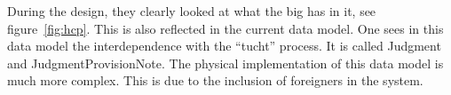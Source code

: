 During the design, they clearly looked at what the \acrshort{big} has in it, see figure~\ref{fig:hcp}.
This is also reflected in the current data model.
One sees in this data model the interdependence with the ``tucht'' process.
It is called Judgment and JudgmentProvisionNote.
The physical implementation of this data model is much more complex.
This is due to the inclusion of foreigners in the system.
